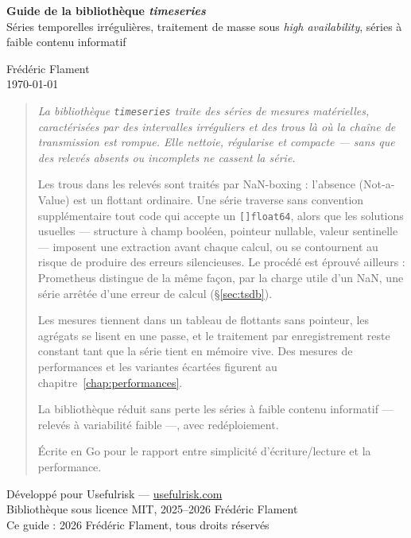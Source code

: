 \documentclass[11pt,a4paper]{report}
\renewenvironment{abstract}{\begin{quotation}\small\itshape\noindent}{\end{quotation}}
\newcommand{\montitre}{Guide de la bibliothèque \textit{timeseries}}
\newcommand{\monsoustitre}{Séries temporelles irrégulières,  traitement de masse sous  \textit{high availability}, séries à faible contenu informatif}
\newcommand{\monauteur}{Frédéric Flament}
\newcommand{\monorganisation}{Développé pour Usefulrisk ---
\href{https://usefulrisk.com}{usefulrisk.com}}
\newcommand{\malicencecode}{Bibliothèque sous licence MIT,
\textcopyright{} 2025--2026 Frédéric Flament}
\newcommand{\malicenceguide}{Ce guide : \textcopyright{} 2026
Frédéric Flament, tous droits réservés}
\begin{document}
\begin{titlepage}

\begin{center}
  \vspace*{5cm}

  {\LARGE\bfseries \montitre}\\[0.6em]
  {\large \monsoustitre}

  \vspace{3cm}

  {\large \monauteur}\\[1em]
  {\today}
\end{center}

\vspace{3cm}

\begin{abstract}
La bibliothèque \texttt{timeseries} traite des séries de mesures matérielles, caractérisées par des intervalles irréguliers et des trous là où la chaîne de
transmission est rompue. Elle nettoie, régularise et compacte --- sans
que des relevés absents ou incomplets ne cassent la série.

Les trous dans les relevés sont traités par NaN-boxing : l'absence (Not-a-Value) est un flottant ordinaire. Une
série traverse sans convention supplémentaire tout code qui accepte
un \texttt{[]float64}, alors que les solutions usuelles --- structure à
champ booléen, pointeur nullable, valeur sentinelle ---
imposent une extraction avant chaque calcul, ou se contournent au risque
de produire des erreurs silencieuses. Le procédé est éprouvé ailleurs :
Prometheus distingue de la même façon, par la charge utile d'un NaN, une
série arrêtée d'une erreur de calcul (\S\ref{sec:tsdb}).

Les mesures tiennent dans un tableau de flottants sans pointeur, les agrégats se lisent en une passe, et le traitement par enregistrement reste
constant tant que la série tient en mémoire vive. Des mesures de performances et les
variantes écartées figurent au chapitre~\ref{chap:performances}.

La bibliothèque réduit sans perte  les séries à faible contenu informatif --- relevés à
variabilité faible ---, avec redéploiement.

Écrite en Go pour le rapport entre simplicité d'écriture/lecture et la performance.

\end{abstract}

\vfill

\begin{center}
  \small
  \monorganisation\\[0.5em]
  \malicencecode\\[0.2em]
  \malicenceguide
\end{center}

\end{titlepage}
\end{document}
